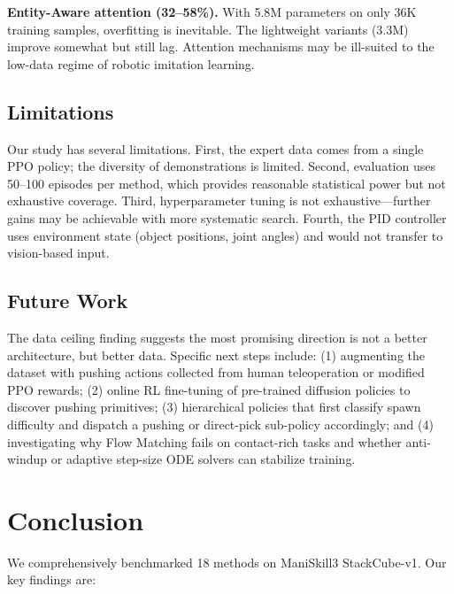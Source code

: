 \documentclass[twocolumn]{article}
\begin{document}
\textbf{Entity-Aware attention (32--58\%).} With 5.8M parameters on only 36K training samples, overfitting is inevitable. The lightweight variants (3.3M) improve somewhat but still lag. Attention mechanisms may be ill-suited to the low-data regime of robotic imitation learning.

\subsection{Limitations}

Our study has several limitations. First, the expert data comes from a single PPO policy; the diversity of demonstrations is limited. Second, evaluation uses 50--100 episodes per method, which provides reasonable statistical power but not exhaustive coverage. Third, hyperparameter tuning is not exhaustive---further gains may be achievable with more systematic search. Fourth, the PID controller uses environment state (object positions, joint angles) and would not transfer to vision-based input.

\subsection{Future Work}

The data ceiling finding suggests the most promising direction is not a better architecture, but better data. Specific next steps include: (1) augmenting the dataset with pushing actions collected from human teleoperation or modified PPO rewards; (2) online RL fine-tuning of pre-trained diffusion policies to discover pushing primitives; (3) hierarchical policies that first classify spawn difficulty and dispatch a pushing or direct-pick sub-policy accordingly; and (4) investigating why Flow Matching fails on contact-rich tasks and whether anti-windup or adaptive step-size ODE solvers can stabilize training.

\section{Conclusion}

We comprehensively benchmarked 18 methods on ManiSkill3 StackCube-v1. Our key findings are:
\end{document}
